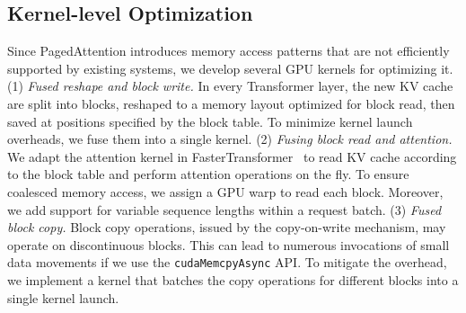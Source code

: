 \documentclass[sigplan,10pt]{acmart}
\newcommand{\tech}[0]{PagedAttention\xspace}
\begin{document}
\subsection{Kernel-level Optimization}
\label{sec:impl-kernel}

Since \tech introduces memory access patterns that are not efficiently supported by existing systems, we develop several GPU kernels for optimizing it.
(1) \emph{Fused reshape and block write.}
In every Transformer layer, the new KV cache are split into blocks, reshaped to a memory layout optimized for block read, then saved at positions specified by the block table. To minimize kernel launch overheads, we fuse them into a single kernel.
(2) \emph{Fusing block read and attention.}
We adapt the attention kernel in FasterTransformer~\cite{nvidiaft} to read KV cache according to the block table and perform attention operations on the fly.
To ensure coalesced memory access, we assign a GPU warp to read each block.
Moreover, we add support for variable sequence lengths within a request batch.
(3) \emph{Fused block copy.}
Block copy operations, issued by the copy-on-write mechanism, may operate on discontinuous blocks.
This can lead to numerous invocations of small data movements if we use the \texttt{cudaMemcpyAsync} API.
To mitigate the overhead, we implement a kernel that batches the copy operations for different blocks into a single kernel launch.
\end{document}
